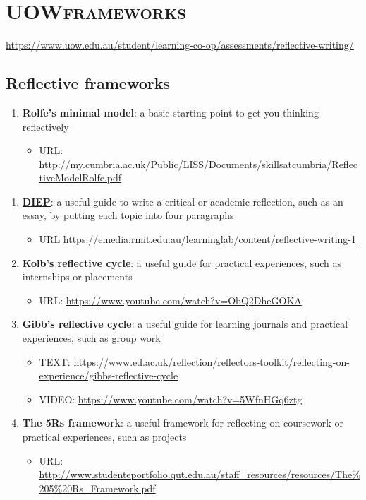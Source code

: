 \documentclass[11pt]{article}
\begin{document}
\section{UOW\hfill{}\textsc{frameworks}}
\label{sec:orgdeee4fb}
\url{https://www.uow.edu.au/student/learning-co-op/assessments/reflective-writing/}

\subsection{Reflective frameworks}
\label{sec:org19517f4}
\begin{enumerate}
\item \textbf{Rolfe’s minimal model}: a basic starting point to get you thinking reflectively
\begin{itemize}
\item URL:   \url{http://my.cumbria.ac.uk/Public/LISS/Documents/skillsatcumbria/ReflectiveModelRolfe.pdf}
\end{itemize}
\end{enumerate}



\begin{enumerate}
\item \textbf{\hyperref[sec:orga1dc854]{DIEP}}: a useful guide to write a critical or academic reflection, such as an essay, by putting each topic into four paragraphs
\begin{itemize}
\item URL \url{https://emedia.rmit.edu.au/learninglab/content/reflective-writing-1}
\end{itemize}

\item \textbf{Kolb’s reflective cycle}: a useful guide for practical experiences, such as internships or placements
\begin{itemize}
\item URL: \url{https://www.youtube.com/watch?v=ObQ2DheGOKA}
\end{itemize}

\item \textbf{Gibb’s reflective cycle}: a useful guide for learning journals and practical experiences, such as group work
\begin{itemize}
\item TEXT: \url{https://www.ed.ac.uk/reflection/reflectors-toolkit/reflecting-on-experience/gibbs-reflective-cycle}
\item VIDEO: \url{https://www.youtube.com/watch?v=5WfnHGq6ztg}
\end{itemize}

\item \textbf{The 5Rs framework}: a useful framework for reflecting on coursework or practical experiences, such as projects
\begin{itemize}
\item URL:  \url{http://www.studenteportfolio.qut.edu.au/staff\_resources/resources/The\%205\%20Rs\_Framework.pdf}
\end{itemize}
\end{enumerate}
\end{document}
